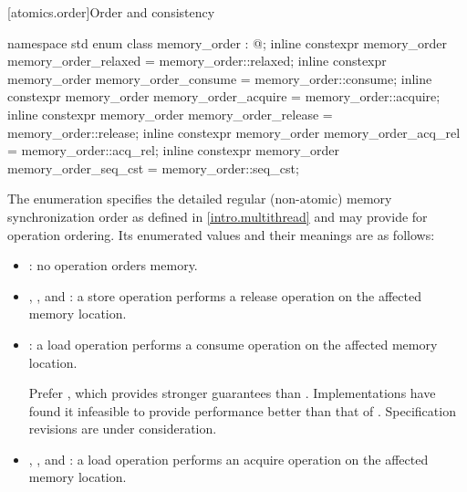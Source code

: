 [atomics.order]{Order and consistency}
%
%
%
%
%
%
%
%
%
%
%
%
%

\begin{codeblock}
namespace std {
  enum class memory_order : @;
  inline constexpr memory_order memory_order_relaxed = memory_order::relaxed;
  inline constexpr memory_order memory_order_consume = memory_order::consume;
  inline constexpr memory_order memory_order_acquire = memory_order::acquire;
  inline constexpr memory_order memory_order_release = memory_order::release;
  inline constexpr memory_order memory_order_acq_rel = memory_order::acq_rel;
  inline constexpr memory_order memory_order_seq_cst = memory_order::seq_cst;
}
\end{codeblock}

\pnum
The enumeration  specifies the detailed regular
(non-atomic) memory synchronization order as defined in
\ref{intro.multithread} and may provide for operation ordering. Its
enumerated values and their meanings are as follows:

\begin{itemize}
\item {}: no operation orders memory.

\item {}, , and
: a store operation performs a release operation on the
affected memory location.

\item {}: a load operation performs a consume operation on the
affected memory location.
\begin{note}
Prefer , which provides stronger guarantees
than . Implementations have found it infeasible
to provide performance better than that of .
Specification revisions are under consideration.
\end{note}

\item {}, , and
: a load operation performs an acquire operation on the
affected memory location.
\end{itemize}

